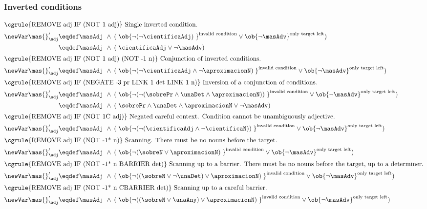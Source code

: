 \subsubsection{Inverted conditions}


\begin{align}
\intertext{\cgrule{REMOVE adj IF (NOT 1 adj)} Single inverted condition.}
  \newVar \mas{}'_\adj 
     & \eqdef \masAdj\ 
     \wedge\: ( \; \ob{\neg (\neg \cientificaAdj)\;}^{\invConds} 
     \vee \ob{\neg\masAdv}^{\onlyTrgLeft} ) \notag \\
     & \eqdef \masAdj\ 
     \wedge\: ( \; \cientificaAdj
     \vee  \neg\masAdv )  \\
%
\intertext{\cgrule{REMOVE adj IF (NOT 1 adj) (NOT -1 n)} Conjunction of inverted conditions.}
  \newVar \mas{}'_\adj 
     & \eqdef \masAdj\ 
     \wedge\: ( \; \ob{\neg (\neg \cientificaAdj \wedge \neg \aproximacionN)\;}^{\invConds} 
     \vee \ob{\neg\masAdv}^{\onlyTrgLeft} )  \\
%
%
\intertext{\cgrule{REMOVE adj IF (NEGATE -3 pr LINK 1 det LINK 1 n)} Inversion of a conjunction of conditions.}
%
  \newVar \mas{}'_\adj 
     & \eqdef \masAdj\ 
     \wedge\: ( \; \ob{\neg (\neg (\sobrePr \wedge \unaDet \wedge \aproximacionN))\;}^{\invConds} 
     \vee \ob{\neg\masAdv}^{\onlyTrgLeft} ) \notag \\
     & \eqdef \masAdj\ 
     \wedge\: ( \;  \sobrePr \wedge \unaDet \wedge \aproximacionN
     \vee \neg\masAdv )   \\
%
%
\intertext{\cgrule{REMOVE adj IF (NOT 1C adj)} Negated careful context. Condition cannot be unambiguously adjective.}
%
  \newVar \mas{}'_\adj 
     & \eqdef \masAdj\ 
     \wedge\: ( \; \ob{\neg (\neg (\cientificaAdj \wedge \neg\cientificaN ))\;}^{\invConds}
     \vee \ob{\neg\masAdv }^{\onlyTrgLeft} ) \\
%
%
\intertext{\cgrule{REMOVE adj IF (NOT -1* n)} Scanning. There must be no nouns before the target.}
%
  \newVar \mas{}'_\adj 
     & \eqdef \masAdj\ 
     \wedge\: ( \; \ob{\neg ( \sobreN \vee \aproximacionN )\;}^{\invConds}
     \vee \ob{\neg\masAdv }^{\onlyTrgLeft} ) \\
%
\intertext{\cgrule{REMOVE adj IF (NOT -1* n BARRIER det)} Scanning up to a barrier. There must be no nouns before the target, up to a determiner.}
%
  \newVar \mas{}'_\adj 
     & \eqdef \masAdj\ 
     \wedge\: ( \; \ob{\neg ( (\sobreN \vee \neg\unaDet) \vee \aproximacionN )\;}^{\invConds}
     \vee \ob{\neg\masAdv }^{\onlyTrgLeft} ) \\
%
%
\intertext{\cgrule{REMOVE adj IF (NOT -1* n CBARRIER det)} Scanning up to a careful barrier.}
%
  \newVar \mas{}'_\adj 
     & \eqdef \masAdj\ 
     \wedge\: ( \; \ob{\neg ( (\sobreN \vee \unaAny) \vee \aproximacionN )\;}^{\invConds}
     \vee \ob{\neg\masAdv }^{\onlyTrgLeft} ) 
%
%
%
\end{align}


